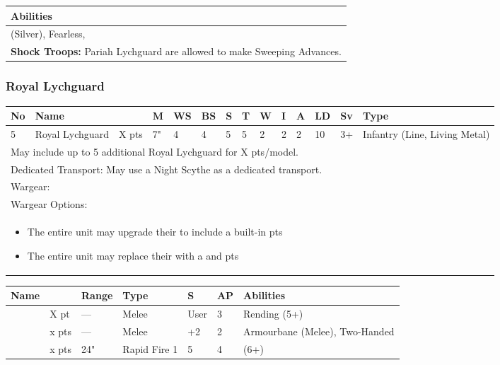 \noindent
\begin{tabular}{||m{532pt}||}
	\hline
	Abilities \\
	\hline
	\quickref{Awakening Protocols} (Silver), Fearless, \quickref{Reanimation Protocols} \\
	\textbf{Shock Troops:} Pariah Lychguard are allowed to make Sweeping Advances. \\
	\hline
\end{tabular}


\newpage
\subsubsection{Royal Lychguard}

\noindent
\begin{tabular}{||m{10pt} m{90pt} m{30pt} m{11pt} m{11pt} m{11pt} m{11pt} m{11pt} m{11pt} m{11pt} m{11pt} m{11pt} m{11pt} m{135pt}||}
	\hline
	No & Name & & M & WS & BS & S & T & W & I & A & LD & Sv & Type \\
	\hline
	5 & Royal Lychguard & X pts & 7" & 4 & 4 & 5 & 5 & 2 & 2 & 2 & 10 & 3+ & Infantry (Line, Living Metal)\\
	\hline
	\hline
	\multicolumn{14}{||Z{532 pt}||}{May include up to 5 additional Royal Lychguard for X pts/model.}\\	
	\multicolumn{14}{||Z{532 pt}||}{Dedicated Transport: May use a Night Scythe as a dedicated transport.}\\	
	\hline
	\hline
	\multicolumn{14}{||Z{532 pt}||}{Wargear: \quickref{Warscythe}}\\
	\multicolumn{14}{||Z{532 pt}||}{Wargear Options:} \\
	\multicolumn{14}{||Z{532 pt}||}{\begin{itemize}
			\item The entire unit may upgrade their \quickref{Warscythe} to include a built-in \quickref{Gauss Blaster} \hrulefill 5 pts
			\item The entire unit may replace their \quickref{Warscythe} with a \quickref{Hyperphase Sword} and \quickref{Dispersion Shield} \hrulefill 10 pts
	\end{itemize}} \\
	\hline
\end{tabular}

\noindent
\begin{tabular}{||m{110pt} m{30pt} m{31pt} m{55pt} m{12pt} m{12pt} m{210pt}||}
	\hline
	Name & & Range & Type & S & AP & Abilities \\
	\hline
	\quickref{Hyperphase Sword} & X pt & — & Melee & User & 3 & Rending (5+) \\
	\quickref{Warscythe} & x pts& — & Melee & +2 & 2 & Armourbane (Melee), Two-Handed \\
	\quickref{Gauss Blaster} & x pts& 24" & Rapid Fire 1 & 5 & 4 & \quickref{Gauss} (6+) \\
	\hline
\end{tabular}

